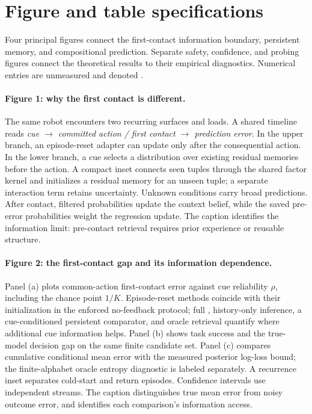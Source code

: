 \section{Figure and table specifications}\label{sec:figures}
Four principal figures connect the first-contact information boundary, persistent memory, and compositional prediction. Separate safety, confidence, and probing figures connect the theoretical results to their empirical diagnostics. Numerical entries are unmeasured and denoted \placeholder{}.

\paragraph{Figure 1: why the first contact is different.}
The same robot encounters two recurring surfaces and loads. A shared timeline reads \emph{cue $\rightarrow$ committed action / first contact $\rightarrow$ prediction error}. In the upper branch, an episode-reset adapter can update only after the consequential action. In the lower branch, a cue selects a distribution over existing residual memories before the action. A compact inset connects seen tuples through the shared factor kernel and initializes a residual memory for an unseen tuple; a separate interaction term retains uncertainty. Unknown conditions carry broad predictions. After contact, filtered probabilities update the context belief, while the saved pre-error probabilities weight the regression update. The caption identifies the information limit: pre-contact retrieval requires prior experience or reusable structure.

\paragraph{Figure 2: the first-contact gap and its information dependence.}
Panel (a) plots common-action first-contact error against cue reliability $\rho$, including the chance point $1/K$. Episode-reset methods coincide with their initialization in the enforced no-feedback protocol; full \method{}, history-only inference, a cue-conditioned persistent comparator, and oracle retrieval quantify where additional cue information helps. Panel (b) shows task success and the true-model decision gap on the same finite candidate set. Panel (c) compares cumulative conditional mean error with the measured posterior log-loss bound; the finite-alphabet oracle entropy diagnostic is labeled separately. A recurrence inset separates cold-start and return episodes. Confidence intervals use independent streams. The caption distinguishes true mean error from noisy outcome error, and identifies each comparison's information access.

